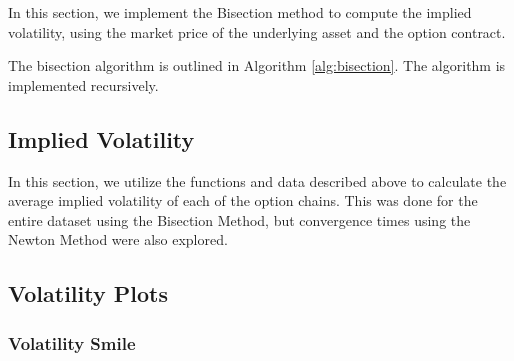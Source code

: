 \documentclass[10pt]{article}
\begin{document}
        In this section, we implement the Bisection method to compute the implied volatility, using the market price of the underlying asset and the option contract.

        The bisection algorithm is outlined in Algorithm \ref{alg:bisection}. The algorithm is implemented recursively.

        


    \subsection{Implied Volatility}

    In this section, we utilize the functions and data described above to calculate the average implied volatility of each of the option chains. This was done for the entire dataset using the Bisection Method, but convergence times using the Newton Method were also explored.

    \subsection{Volatility Plots}
        \subsubsection{Volatility Smile}
        
\end{document}
